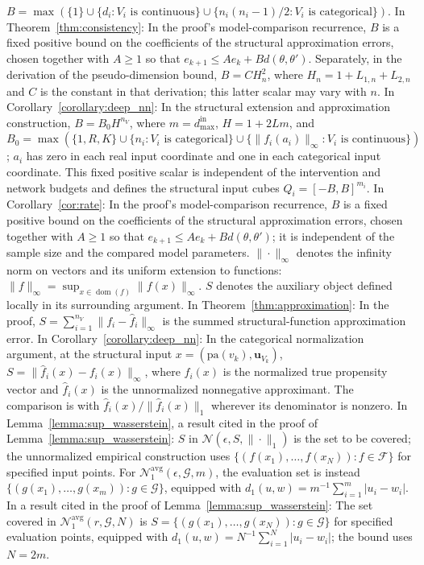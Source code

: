 \documentclass[12pt]{article}
\theoremstyle{plain}
\theoremstyle{definition}
\theoremstyle{remark}
\begin{document}
$B=\max\left(\{1\}\cup\{d_i:V_i\text{ is continuous}\}\cup\{n_i(n_i-1)/2:V_i\text{ is categorical}\}\right)$. In Theorem~\ref{thm:consistency}: In the proof's model-comparison recurrence, $B$ is a fixed positive bound on the coefficients of the structural approximation errors, chosen together with $A\geqslant1$ so that $e_{k+1}\leqslant Ae_k+B d(\theta,\theta')$. Separately, in the derivation of the pseudo-dimension bound, $B=CH_n^2$, where $H_n=1+L_{1,n}+L_{2,n}$ and $C$ is the constant in that derivation; this latter scalar may vary with $n$. In Corollary~\ref{corollary:deep_nn}: In the structural extension and approximation construction, $B=B_0H^{n_V}$, where $m=d_{\max}^{\text{in}}$, $H=1+2Lm$, and $B_0=\max\left(\{1,R,K\}\cup\{n_i:V_i\text{ is categorical}\}\cup\{\|f_i(a_i)\|_\infty:V_i\text{ is continuous}\}\right)$; $a_i$ has zero in each real input coordinate and one in each categorical input coordinate. This fixed positive scalar is independent of the intervention and network budgets and defines the structural input cubes $Q_i=[-B,B]^{m_i}$. In Corollary~\ref{cor:rate}: In the proof's model-comparison recurrence, $B$ is a fixed positive bound on the coefficients of the structural approximation errors, chosen together with $A\geqslant1$ so that $e_{k+1}\leqslant Ae_k+B d(\theta,\theta')$; it is independent of the sample size and the compared model parameters. $\|\cdot\|_\infty$ denotes the infinity norm on vectors and its uniform extension to functions: $\|f\|_\infty=\sup_{x\in\operatorname{dom}(f)}\|f(x)\|_\infty$. $S$ denotes the auxiliary object defined locally in its surrounding argument. In Theorem~\ref{thm:approximation}: In the proof, $S=\sum_{i=1}^{n_V}\|f_i-\hat{f}_i\|_\infty$ is the summed structural-function approximation error. In Corollary~\ref{corollary:deep_nn}: In the categorical normalization argument, at the structural input $x=(\text{pa}(v_k),\boldsymbol{u}_{V_k})$, $S=\|\hat f_i(x)-f_i(x)\|_\infty$, where $f_i(x)$ is the normalized true propensity vector and $\hat f_i(x)$ is the unnormalized nonnegative approximant. The comparison is with $\hat f_i(x)/\|\hat f_i(x)\|_1$ wherever its denominator is nonzero. In Lemma~\ref{lemma:sup_wasserstein}, a result cited in the proof of Lemma~\ref{lemma:sup_wasserstein}: $S$ in $\mathcal{N}(\epsilon,S,\|\cdotp\|_1)$ is the set to be covered; the unnormalized empirical construction uses $\{(f(x_1),\ldots,f(x_N)):f\in\mathcal F\}$ for specified input points. For $\mathcal{N}_1^{\mathrm{avg}}(\epsilon,\mathcal G,m)$, the evaluation set is instead $\{(g(x_1),\ldots,g(x_m)):g\in\mathcal G\}$, equipped with $d_1(u,w)=m^{-1}\sum_{i=1}^m|u_i-w_i|$. In a result cited in the proof of Lemma~\ref{lemma:sup_wasserstein}: The set covered in $\mathcal{N}_1^{\mathrm{avg}}(r,\mathcal G,N)$ is $S=\{(g(x_1),\ldots,g(x_N)):g\in\mathcal G\}$ for specified evaluation points, equipped with $d_1(u,w)=N^{-1}\sum_{i=1}^N|u_i-w_i|$; the bound uses $N=2m$.
\end{document}
